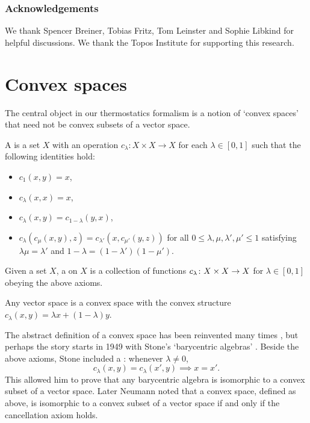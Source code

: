 \documentclass[12pt, reqno]{amsart}
\begin{document}
\subsubsection*{Acknowledgements}

We thank Spencer Breiner, Tobias Fritz, Tom Leinster and Sophie Libkind for helpful discussions. We thank the Topos Institute for supporting this research.

\section{Convex spaces}
\label{sec:convex_spaces}

The central object in our thermostatics formalism is a notion of `convex spaces' that need not be convex subsets of a vector space. 

\begin{definition}
    A  is a set $X$ with an operation $c_\lambda \colon X \times X \to X$ for each $\lambda \in [0, 1]$ such that the following identities hold:
    \begin{itemize}
        \item $c_1(x, y) = x$, 
        \item $c_\lambda(x, x) = x$, 
        \item $c_\lambda(x, y) = c_{1-\lambda}(y, x)$, 
        \item $c_\lambda(c_\mu(x, y) , z) = c_{\lambda'}(x, c_{\mu'}(y, z))$ for all $0 \le \lambda, \mu, \lambda', \mu' \le 1$ satisfying $\lambda\mu = \lambda'$ and $ 1-\lambda = (1-\lambda')(1-\mu')$.
    \end{itemize}
Given a set $X$, a  on $X$ is a collection of functions $c_\lambda \colon X \times X \rightarrow X$ for $\lambda \in [0,1]$ obeying the above axioms.
\end{definition}

\begin{example}
Any vector space is a convex space with the convex structure $c_\lambda(x, y) = \lambda x + (1-\lambda)y$.
\end{example} 

The abstract definition of a convex space has been reinvented many times \cite{Fritz}, but perhaps the story starts in 1949 with Stone's `barycentric algebras' \cite{Stone}. Beside the above axioms, Stone included a : whenever $\lambda \ne 0$, 
\[  c_\lambda(x,y) = c_\lambda(x',y) \implies x = x' . \]
This allowed him to prove that any barycentric algebra is isomorphic to a convex subset of a vector space. Later Neumann \cite{Neumann} noted that a convex space, defined as above, is isomorphic to a convex subset of a vector space if and only if the cancellation axiom holds. 
\end{document}
